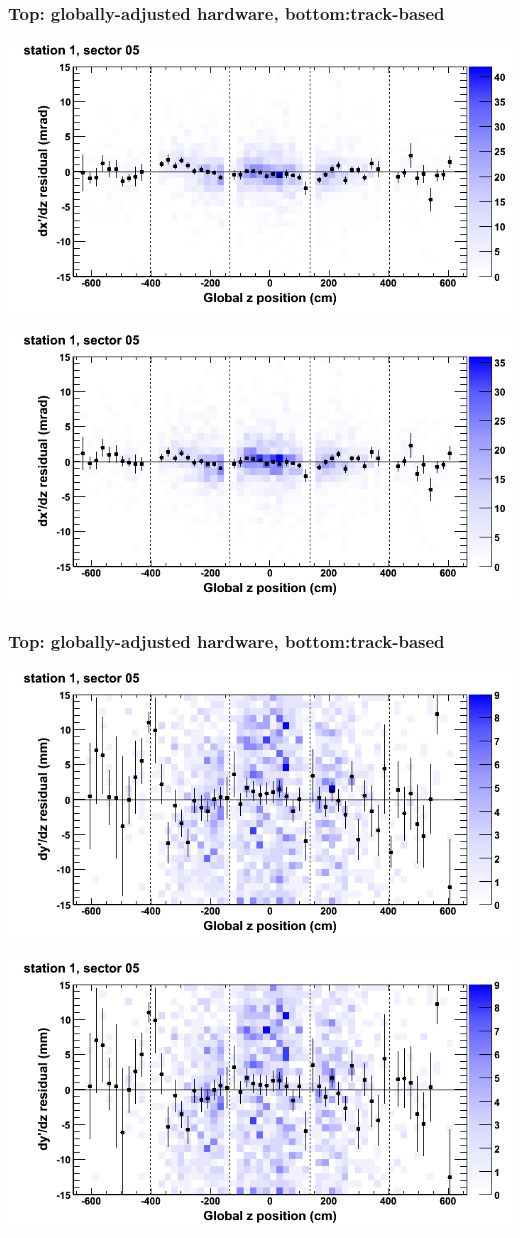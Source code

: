 \documentclass[compress]{beamer}
\begin{document}
\begin{frame}
\frametitle{Top: globally-adjusted hardware, bottom:track-based}
\includegraphics[width=0.7\linewidth]{NOV4_mapplots_HW/DTvsz_st1sec05_dxdz.png}

\includegraphics[width=0.7\linewidth]{NOV4_mapplots/DTvsz_st1sec05_dxdz.png}
\end{frame}

\begin{frame}
\frametitle{Top: globally-adjusted hardware, bottom:track-based}
\includegraphics[width=0.7\linewidth]{NOV4_mapplots_HW/DTvsz_st1sec05_dydz.png}

\includegraphics[width=0.7\linewidth]{NOV4_mapplots/DTvsz_st1sec05_dydz.png}
\end{frame}
\end{document}
